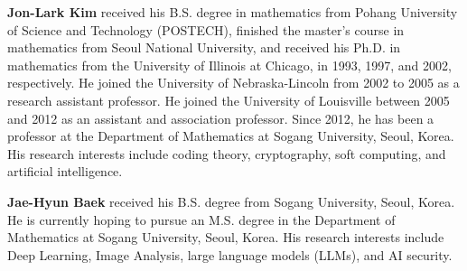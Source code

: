 \vspace{2pc}

\vspace{2pc}

\bio{}
\textbf{Jon-Lark Kim} received his B.S. degree in mathematics from Pohang University of Science and Technology (POSTECH), finished the master’s course in mathematics from Seoul National University, and received his Ph.D. in mathematics from the University of Illinois at Chicago, in 1993, 1997, and 2002, respectively. He joined the University of Nebraska-Lincoln from 2002 to 2005 as a research assistant professor. He joined the University of Louisville between 2005 and 2012 as an assistant and association professor. Since 2012, he has been a professor at the Department of Mathematics at Sogang University, Seoul, Korea. His research interests include coding theory, cryptography, soft computing, and artificial intelligence.
\endbio

\bio{}
\textbf{Jae-Hyun Baek} received his B.S. degree from Sogang University, Seoul, Korea. He is currently hoping to pursue an M.S. degree in the Department of Mathematics at Sogang University, Seoul, Korea. His research interests include Deep Learning, Image Analysis, large language models (LLMs), and AI security.
\endbio
